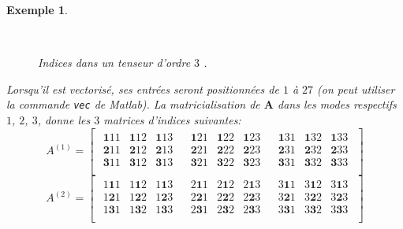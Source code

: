 \documentclass[11pt,a4paper,oneside]{book}
\newtheorem{ex}{Exemple}[chapter]}
\newcommand{\mbf}[1]{\mathbf{#1}}
\newcommand{\cre}[1]{\textcolor{dkred}{#1}}
\begin{document}
\begin{ex}
\begin{figure}[htbp]
{\emph{\\}
	\vspace{0.2cm}}
	\caption{ %
		Indices dans un tenseur d'ordre $3$
		 \cite[p.136]{Nyenyezi2018}.}
	\label{fig:Tenseurd'ordre3}
\end{figure}
Lorsqu'il est vectorisé, ses entrées seront positionnées de $ 1 $ à $ 27 $ (on peut utiliser la commande \texttt{vec} de {\ttfamily Matlab}). La matricialisation
de $ \mathbf{A} $ dans les modes respectifs $ 1 $, $ 2 $, $ 3 $, donne les $ 3 $ matrices d'indices suivantes:
$$A^{(1)}=
\begin{bmatrix}
\begin{array}{*{11}{c}}
\mbf{1}11&\mbf{1}12&\mbf{1}13&&\mbf{1}21&\mbf{1}22&\mbf{1}23&&\mbf{1}31&\mbf{1}32&\mbf{1}33\\
\mbf{2}11&\mbf{2}12&\mbf{2}13&&\mbf{2}21&\mbf{2}22&\mbf{2}23&&\mbf{2}31&\mbf{2}32&\mbf{2}33\\
\mbf{3}11&\mbf{3}12&\mbf{3}13&&\mbf{3}21&\mbf{3}22&\mbf{3}23&&\mbf{3}31&\mbf{3}32&\mbf{3}33\\
\end{array}
\end{bmatrix}$$
$$A^{(2)}=\begin{bmatrix}
\begin{array}{*{11}{c}}
1\mbf{1}1&1\mbf{1}2&1\mbf{1}3&&2\mbf{1}1&2\mbf{1}2&2\mbf{1}3&&3\mbf{1}1&3\mbf{1}2&3\mbf{1}3\\
1\mbf{2}1&1\mbf{2}2&1\mbf{2}3&&2\mbf{2}1&2\mbf{2}2&2\mbf{2}3&&3\mbf{2}1&3\mbf{2}2&3\mbf{2}3\\
1\mbf{3}1&1\mbf{3}2&1\mbf{3}3&&2\mbf{3}1&2\mbf{3}2&2\mbf{3}3&&3\mbf{3}1&3\mbf{3}2&3\mbf{3}3\\
\end{array}
\end{bmatrix}$$


\end{ex}
\end{document}

